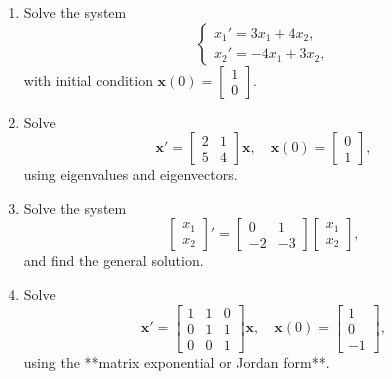     
      \begin{question}
        \begin{enumerate}
          \item Solve the system
          \[
              \begin{cases}
                  x_1' = 3x_1 + 4x_2, \\
                  x_2' = -4x_1 + 3x_2,
              \end{cases}
          \]
          with initial condition $\mathbf{x}(0) = \begin{bmatrix} 1 \\ 0 \end{bmatrix}$.

          \item Solve 
          \[
              \mathbf{x}' = \begin{bmatrix} 2 & 1 \\ 5 & 4 \end{bmatrix} \mathbf{x}, \quad \mathbf{x}(0) = \begin{bmatrix} 0 \\ 1 \end{bmatrix},
          \]
          using eigenvalues and eigenvectors.

          \item Solve the system
          \[
              \begin{bmatrix} x_1 \\ x_2 \end{bmatrix}' = \begin{bmatrix} 0 & 1 \\ -2 & -3 \end{bmatrix} \begin{bmatrix} x_1 \\ x_2 \end{bmatrix},
          \]
          and find the general solution.

          \item Solve 
          \[
              \mathbf{x}' = \begin{bmatrix} 1 & 1 & 0 \\ 0 & 1 & 1 \\ 0 & 0 & 1 \end{bmatrix} \mathbf{x}, \quad \mathbf{x}(0) = \begin{bmatrix} 1 \\ 0 \\ -1 \end{bmatrix},
          \]
          using the **matrix exponential or Jordan form**.


\end{enumerate}
\end{question}
